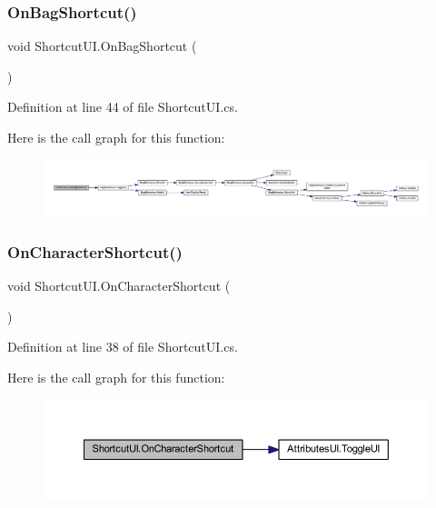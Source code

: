 \subsubsection{\texorpdfstring{OnBagShortcut()}{OnBagShortcut()}}
{\footnotesize\ttfamily void Shortcut\+U\+I.\+On\+Bag\+Shortcut (\begin{DoxyParamCaption}{ }\end{DoxyParamCaption})}



Definition at line 44 of file Shortcut\+U\+I.\+cs.

Here is the call graph for this function\+:
\nopagebreak
\begin{figure}[H]
\begin{center}
\leavevmode
\includegraphics[width=350pt]{class_shortcut_u_i_a2434bf0b041a115161fda12022d69f0b_cgraph}
\end{center}
\end{figure}
\mbox{\label{class_shortcut_u_i_aa9dca9d0598a36d8df6555d26e75f176}} 
\subsubsection{\texorpdfstring{OnCharacterShortcut()}{OnCharacterShortcut()}}
{\footnotesize\ttfamily void Shortcut\+U\+I.\+On\+Character\+Shortcut (\begin{DoxyParamCaption}{ }\end{DoxyParamCaption})}



Definition at line 38 of file Shortcut\+U\+I.\+cs.

Here is the call graph for this function\+:
\nopagebreak
\begin{figure}[H]
\begin{center}
\leavevmode
\includegraphics[width=350pt]{class_shortcut_u_i_aa9dca9d0598a36d8df6555d26e75f176_cgraph}
\end{center}
\end{figure}
\mbox{\label{class_shortcut_u_i_ac6c1705acfb6d8393f36a73810d94958}} 

